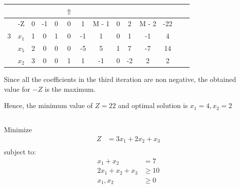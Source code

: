 \documentclass[12pt]{article}
\begin{document}
\begin{center}
\begin{tabular}{|c|c|c|c|ccccccc|c|c|c|}
\hline
       &                    &      &      &              &            $\Uparrow$  &                        &                       &         &         &                    &           &         &                \\
\hline
       &  -Z                &   0  &  -1  &           0  &                     0  &                     1  &                M - 1  &      0  &      2  &             M - 2  &      -22  &         &                \\
    3  &  $x_1$             &   1  &   0  &           1  &                     0  &                    -1  &                    1  &      0  &      1  &                -1  &        4  &         &                \\
       &  $x_5$             &   2  &   0  &           0  &                     0  &                    -5  &                    5  &      1  &      7  &                -7  &       14  &         &                \\
       &  $x_2$             &   3  &   0  &           0  &                     1  &                     1  &                   -1  &      0  &     -2  &                 2  &        2  &         &                \\
\hline
\end{tabular}
\end{center}



Since all the coefficients in the third iteration are non negative, the obtained value for $-Z$ is the maximum.

Hence, the minimum value of $Z=22$ and optimal solution is $x_1=4, x_2=2$
\subsection{}


Minimize
\begin{align*}
Z            & =3x_1+2x_2+x_3 \\
\end{align*}
subject to:
\begin{align*}
x_1+x_2      & = 7            \\
2x_1+x_2+x_3 & \ge 10         \\
x_1,x_2      & \ge 0
\end{align*}
\end{document}
